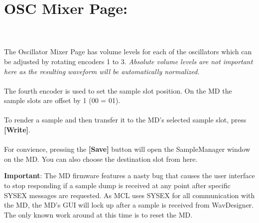 \section{OSC Mixer Page:}
\\\\
The Oscillator Mixer Page has volume levels for each of the oscillators which can be adjusted by rotating encoders 1 to 3. \textit{Absolute volume levels are not important here as the resulting waveform will be automatically normalized.}\\
\\The fourth encoder is used to set the sample slot position. On the MD the sample slots are offset by 1 (00 = 01).\\
\\
To render a sample and then transfer it to the MD's selected sample slot, press \textbf{[Write]}.\\
\\
For convience, pressing the \textbf{[Save]} button will open the SampleManager window on the MD. You can also choose the destination slot from here.


\textbf{Important}: The MD firmware features a nasty bug that causes the user interface to stop responding if a sample dump is received at any point after specific SYSEX messages are requested. As MCL uses SYSEX for all communication with the MD, the MD's GUI will lock up after a sample is received from WavDesigner. The only known work around at this time is to reset the MD.